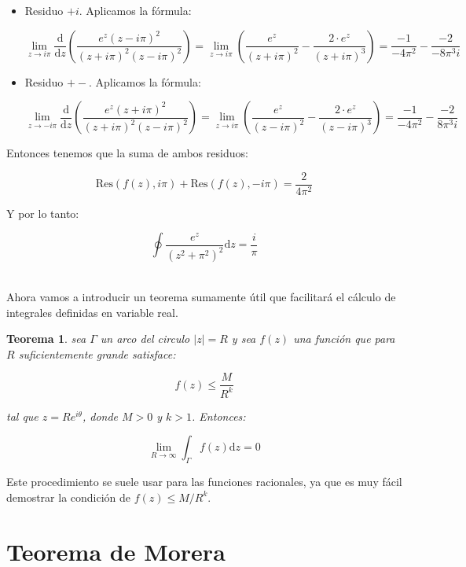 \documentclass[12pt,a4paper]{book}
\newcommand{\parentesis}[1]{\left( #1  \right)}
\newcommand{\D}{\mathrm{d}}
\newcommand{\Res}{\mathrm{Res}}
\newtheorem{theorem}{Teorema}[section]
\begin{document}
\begin{itemize}
\item Residuo $+i$. Aplicamos la fórmula:

$$ \lim_{z \rightarrow i\pi} \dfrac{\D}{\D z} \parentesis{\dfrac{e^z (z- i \pi)^2}{(z+i \pi)^2 (z - i \pi)^2 }} = \lim_{z \rightarrow i\pi} \parentesis{\dfrac{e^z}{(z+i \pi)^2 }- \dfrac{2 \cdot e^z}{(z+i \pi)^3 } }= \dfrac{-1}{-4 \pi^2}- \dfrac{-2}{- 8 \pi^3 i} $$

\item Residuo $+-$. Aplicamos la fórmula:

$$ \lim_{z \rightarrow -i\pi} \dfrac{\D}{\D z} \parentesis{\dfrac{e^z (z+ i \pi)^2}{(z+i \pi)^2 (z - i \pi)^2 }} = \lim_{z \rightarrow i\pi} \parentesis{\dfrac{e^z}{(z-i \pi)^2 }- \dfrac{2 \cdot e^z}{(z-i \pi)^3 } }= \dfrac{-1}{-4 \pi^2}- \dfrac{-2}{8 \pi^3 i} $$
\end{itemize}

Entonces tenemos que la suma de ambos residuos:

$$ \Res (f(z),i \pi) + \Res (f(z), - i \pi) = \dfrac{2}{4\pi^2}$$

Y por lo tanto:


\begin{equation}
\oint  \frac{e^z}{(z^2+\pi^2)^2} \D z = \dfrac{i}{\pi}
\end{equation}

\hrulefill \\


Ahora vamos a introducir un teorema sumamente útil que facilitará el cálculo de integrales definidas en variable real. 

\begin{theorem}
sea $\Gamma$ un arco del circulo $|z|=R$ y sea $f(z)$ una función que para $R$ suficientemente grande satisface:

$$ f(z) \leq \frac{M}{R^k} $$

tal que $z=Re^{i \theta}$, donde $M>0$ y $k>1$. Entonces:

$$ \lim_{R \rightarrow \infty} \int_{\Gamma} f(z) \D z = 0 $$

\end{theorem}

Este procedimiento se suele usar para las funciones racionales, ya que es muy fácil demostrar la condición de $f(z) \leq M/R^k$.

\section{Teorema de Morera}
\end{document}

